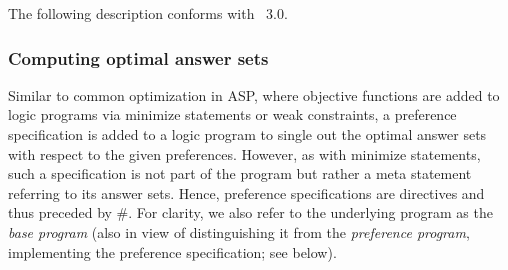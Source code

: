 The following description conforms with \asprin~3.0.%

\subsubsection{Computing optimal answer sets}

Similar to common optimization in ASP,
where objective functions are added to logic programs
via minimize statements or weak constraints,
a preference specification is added to a logic program
to single out the optimal answer sets with respect to the given preferences.
However, as with minimize statements,
such a specification is not part of the program
but rather a meta statement referring to its answer sets.
Hence, preference specifications are directives and thus preceded by \#.
For clarity, we also refer to the underlying program as the \emph{base program}
(also in view of distinguishing it from the \emph{preference program},
implementing the preference specification; see below).

